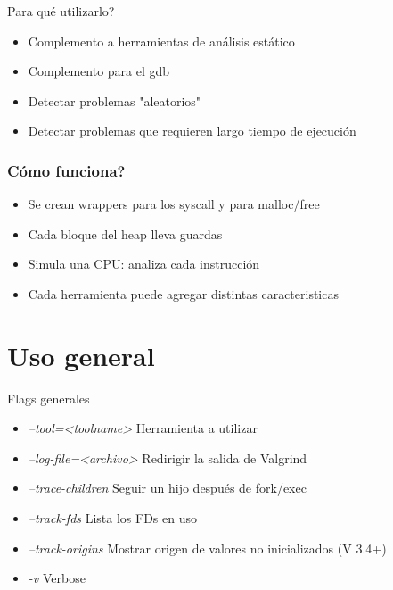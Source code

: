 \documentclass{beamer}
\begin{document}
\begin{frame}{\textquestiondown Para qu\'e utilizarlo?}
\begin{itemize}
  \item Complemento a herramientas de an\'alisis est\'atico
  \item Complemento para el gdb
  \item Detectar problemas "aleatorios"
  \item Detectar problemas que requieren largo tiempo de ejecuci\'on
\end{itemize}
\begin{center}
\end{center}
\end{frame}

\begin{frame}[t]
        \frametitle{\textquestiondown C\'omo funciona?}
\begin{itemize}
  \item Se crean wrappers para los syscall y para malloc/free 
  \item Cada bloque del heap lleva guardas
  \item Simula una CPU: analiza cada instrucci\'on
  \item Cada herramienta puede agregar distintas caracteristicas
\end{itemize}
 {
  \begin{center}
  \end{center}
}
\end{frame}


\section{Uso general}

\begin{frame}{Flags generales}
\begin{itemize}
  \item \textit{ --tool=<toolname> } Herramienta a utilizar
  \item \textit{ --log-file=<archivo> } Redirigir la salida de Valgrind
  \item \textit{ --trace-children } Seguir un hijo despu\'es de fork/exec
  \item \textit{ --track-fds } Lista los FDs en uso 
  \item \textit{ --track-origins } Mostrar origen de valores no inicializados (V 3.4+)
  \item \textit{ -v } Verbose 
\end{itemize}
\end{frame}
\end{document}
